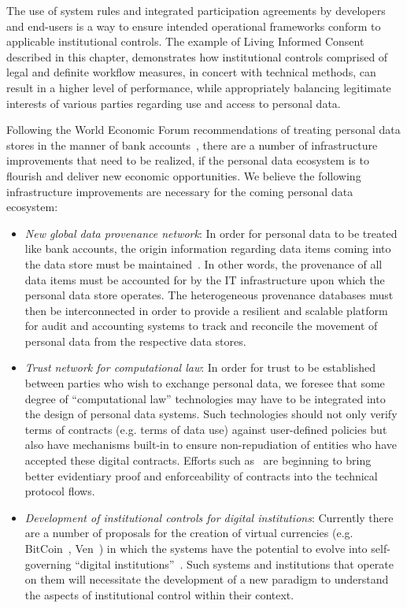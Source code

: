 The use of system rules and integrated participation agreements by developers and end-users is a way to ensure intended operational frameworks conform to applicable institutional controls.
The example of Living Informed Consent described in this chapter, demonstrates how institutional controls comprised of legal and definite workflow measures, in concert with technical methods, can result in a higher level of performance, while appropriately balancing legitimate interests of various parties regarding use and access to personal data.

Following the World Economic Forum recommendations of treating personal data stores in the manner
of bank accounts~\cite{WEF2011}, there are a number of infrastructure improvements that need
to be realized, if the personal data ecosystem is to flourish and deliver new economic opportunities.
We believe the following infrastructure improvements are necessary for the coming personal data ecosystem:

\begin{itemize}
\item  {\em New global data provenance network}:  In order for personal data to be treated
like bank accounts, the origin information regarding data items coming into the data store
must be maintained~\cite{HardjonoGreenwood2013}. 
In other words, the provenance of all data items must be
accounted for by the IT infrastructure upon which the personal data store operates.
The heterogeneous provenance databases must then be interconnected in order
to provide a resilient and scalable platform for audit and accounting systems
to track and reconcile the movement of personal data from the respective data stores.

\item  {\em Trust network for computational law}: In order for trust to be established between
parties who wish to exchange personal data, we foresee that some degree of ``computational law''
technologies may have to be integrated into the design of personal data systems.
Such technologies should not only verify terms of contracts (e.g. terms of data use) against user-defined policies
but also have mechanisms built-in to ensure non-repudiation of entities
who have accepted these digital contracts.
Efforts such as~\cite{UMAcore,UMABindingObligations} are beginning to bring better evidentiary proof and enforceability of contracts
into the technical protocol flows.

\item  {\em Development of institutional controls for digital institutions}:
Currently there are a number of proposals for the creation of virtual currencies (e.g. BitCoin~\cite{BarberBoyen2012}, Ven~\cite{Stalnaker2013})
in which the systems have the potential to evolve into self-governing ``digital institutions''~\cite{HardjonoDeegan2014}.
Such systems and institutions that operate on them will necessitate the development of a new paradigm
to understand the aspects of institutional control within their context.


\end{itemize}



